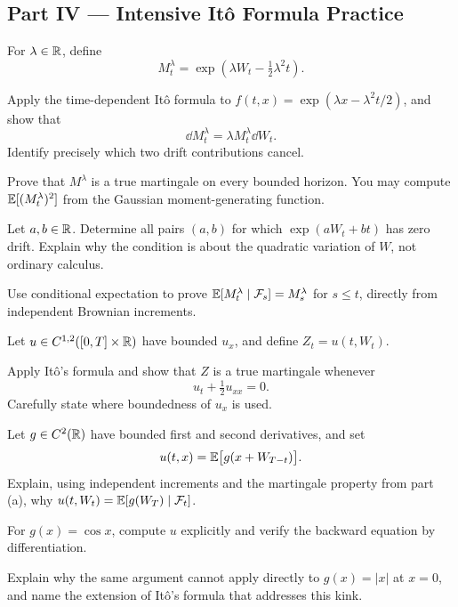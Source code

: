\subsection*{Part IV --- Intensive It\^o Formula Practice}

\begin{exercise}
For \(\lambda\in\mathbb{R}\), define
\[
M_t^{\lambda}=\exp\!\left(\lambda W_t-\tfrac12\lambda^2t\right).
\]
\begin{exparts}
  \item Apply the time-dependent It\^o formula to
  \(f(t,x)=\exp(\lambda x-\lambda^2t/2)\), and show that
  \[\dd M_t^{\lambda}=\lambda M_t^{\lambda}\dd W_t.\]
  Identify precisely which two drift contributions cancel.
  \item Prove that \(M^\lambda\) is a true martingale on every bounded
  horizon. You may compute \(\mathbb{E}[(M_t^\lambda)^2]\) from the Gaussian
  moment-generating function.
  \item Let \(a,b\in\mathbb{R}\). Determine all pairs \((a,b)\) for which
  \(\exp(aW_t+bt)\) has zero drift. Explain why the condition is about
  the quadratic variation of \(W\), not ordinary calculus.
  \item Use conditional expectation to prove
  \(\mathbb{E}[M_t^\lambda\mid\mathcal{F}_s]=M_s^\lambda\) for \(s\leq t\), directly
  from independent Brownian increments.
\end{exparts}
\end{exercise}


\begin{exercise}
Let \(u\in C^{1,2}([0,T]\times\mathbb{R})\) have bounded \(u_x\), and define
\(Z_t=u(t,W_t)\).
\begin{exparts}
  \item Apply It\^o's formula and show that \(Z\) is a true martingale
  whenever
  \[
  u_t+\tfrac12u_{xx}=0.
  \]
  Carefully state where boundedness of \(u_x\) is used.
  \item Let \(g\in C^2(\mathbb{R})\) have bounded first and second derivatives,
  and set
  \[
  u(t,x)=\mathbb{E}\bigl[g(x+W_{T-t})\bigr].
  \]
  Explain, using independent increments and the martingale property from
  part (a), why \(u(t,W_t)=\mathbb{E}[g(W_T)\mid\mathcal{F}_t]\).
  \item For \(g(x)=\cos x\), compute \(u\) explicitly and verify the
  backward equation by differentiation.
  \item Explain why the same argument cannot apply directly to
  \(g(x)=|x|\) at \(x=0\), and name the extension of It\^o's formula
  that addresses this kink.
\end{exparts}
\end{exercise}
